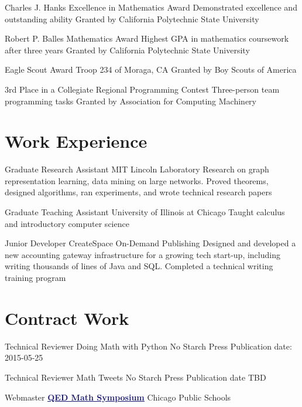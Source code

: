 \documentclass[11pt]{moderncv}
\begin{document}
         {Charles J. Hanks Excellence in Mathematics Award}
      {Demonstrated excellence and outstanding ability}
      {Granted by California Polytechnic State University}
      {}
{}

         {Robert P. Balles Mathematics Award}
      {Highest GPA in mathematics coursework after three years}
      {Granted by California Polytechnic State University}
      {}
{}

         {Eagle Scout Award}
      {Troop 234 of Moraga, CA}
      {Granted by Boy Scouts of America}
      {}
{}

         {3rd Place in a Collegiate Regional Programming Contest}
      {Three-person team programming tasks}
      {Granted by Association for Computing Machinery}
      {}
{}


   \section{Work Experience}
         {Graduate Research Assistant}
      {MIT Lincoln Laboratory}
      {}
      {}
      {Research on graph representation learning, data mining on large networks. Proved theorems, designed algorithms, ran experiments, and wrote technical research papers}

         {Graduate Teaching Assistant}
      {University of Illinois at Chicago}
      {}
      {}
      {Taught calculus and introductory computer science}

         {Junior Developer}
      {CreateSpace On-Demand Publishing}
      {}
      {}
      {Designed and developed a new accounting gateway infrastructure for a growing tech start-up, including writing thousands of lines of Java and SQL. Completed a technical writing training program}


   \section{Contract Work}
         {Technical Reviewer}
      {Doing Math with Python}
      {No Starch Press}
      {}
      {Publication date: 2015-05-25}

         {Technical Reviewer}
      {Math Tweets}
      {No Starch Press}
      {}
      {Publication date TBD}

         {Webmaster}
      {\href{http://qed.wpcp.org/}{\textcolor{MidnightBlue}{\underline{\textbf{QED Math Symposium}}}}}
      {Chicago Public Schools}
      {}
{}
\end{document}

